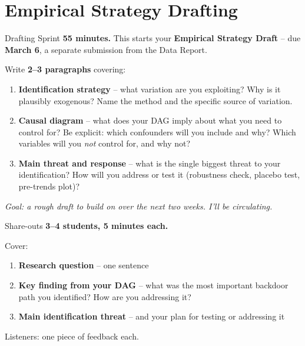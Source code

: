 
\section{Empirical Strategy Drafting}

\begin{frame}{Drafting Sprint}
  \textbf{55 minutes.} This starts your \textbf{Empirical Strategy Draft} -- due \textbf{March 6}, a separate submission from the Data Report.

  \vspace{6pt}

  Write \textbf{2--3 paragraphs} covering:

  \begin{enumerate}
    \item \textbf{Identification strategy} -- what variation are you exploiting? Why is it plausibly exogenous? Name the method and the specific source of variation.

    \item \textbf{Causal diagram} -- what does your DAG imply about what you need to control for? Be explicit: which confounders will you include and why? Which variables will you \textit{not} control for, and why not?

    \item \textbf{Main threat and response} -- what is the single biggest threat to your identification? How will you address or test it (robustness check, placebo test, pre-trends plot)?
  \end{enumerate}

  \vspace{4pt}

  \textit{Goal: a rough draft to build on over the next two weeks. I'll be circulating.}
\end{frame}

\begin{frame}{Share-outs}
  \textbf{3--4 students, 5 minutes each.}

  \vspace{12pt}

  Cover:
  \begin{enumerate}
    \item \textbf{Research question} -- one sentence
    \item \textbf{Key finding from your DAG} -- what was the most important backdoor path you identified? How are you addressing it?
    \item \textbf{Main identification threat} -- and your plan for testing or addressing it
  \end{enumerate}

  \vspace{12pt}

  Listeners: one piece of feedback each.
\end{frame}

